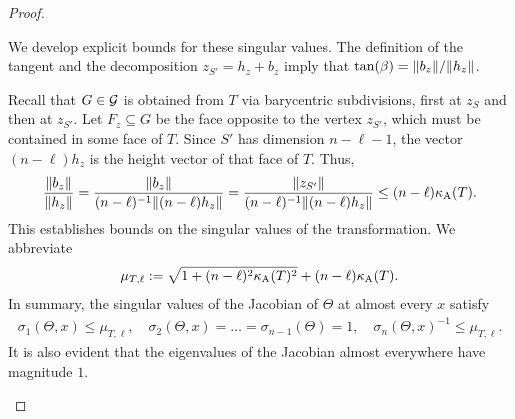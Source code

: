 \documentclass[10pt,a4paper]{article}
\begin{document}
\begin{proof}
\begin{itemize}
        We develop explicit bounds for these singular values. 
        The definition of the tangent and the decomposition $z_{S'} = h_{z} + b_{z}$ 
        imply that $\tan(\beta) = \|  b_{z}  \| / \|  h_{z}  \|$.
        
        Recall that $G \in {\mathcal G}$ is obtained from $T$ via barycentric subdivisions, first at $z_{S}$ and then at $z_{S'}$. 
        Let $F_{z} \subseteq G$ be the face opposite to the vertex $z_{S'}$,
        which must be contained in some face of $T$. 
        Since $S'$ has dimension $n-\ell-1$, the vector $(n-\ell) h_{z}$ is the height vector of that face of $T$. 
        Thus, 
        \begin{align*}
            \frac{ \|  b_{z}  \| }{ \|  h_{z}  \| }
            = 
            \frac{ \|  b_{z}  \| }{ (n-\ell)^{-1} \|  (n-\ell) h_{z}  \| }
            = 
            \frac{ \|  z_{S'}  \| }{ (n-\ell)^{-1} \|  (n-\ell) h_{z}  \| }
            \leq 
            (n-\ell) \kappa_{\rm A}(T)
            .
        \end{align*}
        This establishes bounds on the singular values of the transformation. 
        We abbreviate 
        \begin{align}\label{math:upper_bound_for_theta}
            \mu_{T,\ell} 
            := 
            \sqrt{ 
                1 + (n-\ell)^{2} \aspectratio(T)^{2} %
            } 
            + 
            (n-\ell) \aspectratio(T) %
            .
        \end{align}
        In summary, the singular values of the Jacobian of $\Theta$ at almost every $x$ satisfy 
        \begin{align}
            \sigma_{1}(\Theta,x) \leq \mu_{T,\ell},
            \quad 
            \sigma_{2}(\Theta,x) = \dots = \sigma_{n-1}(\Theta) = 1,
            \quad 
            \sigma_{n}(\Theta,x)^{-1} \leq \mu_{T,\ell}.
        \end{align}
        \color{red}It is also evident that the eigenvalues of the Jacobian almost everywhere have magnitude $1$.\color{black}
        

\end{itemize}
\end{proof}
\end{document}
